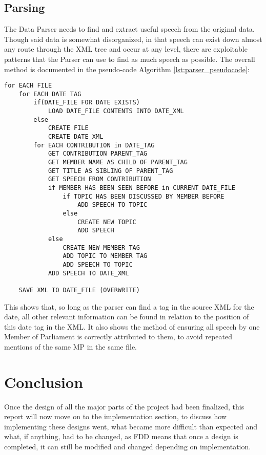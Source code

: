 \subsection{Parsing}
\label{sec:des_Parsing_algorithm}
The Data Parser needs to find and extract useful speech from the original data. Though said data is somewhat disorganized, in that speech can exist down almost any route through the XML tree and occur at any level, there are exploitable patterns that the Parser can use to find as much speech as possible. The overall method is documented in the pseudo-code Algorithm \ref{lst:parser_pseudocode}:
\begin{lstlisting}[float=ht, caption={Data Parser Pseudo-code}, label={lst:parser_pseudocode}]
for EACH FILE
    for EACH DATE TAG
    	if(DATE_FILE FOR DATE EXISTS)
        	LOAD DATE_FILE CONTENTS INTO DATE_XML
    	else
        	CREATE FILE
        	CREATE DATE_XML
    	for EACH CONTRIBUTION in DATE_TAG
        	GET CONTRIBUTION PARENT_TAG
        	GET MEMBER NAME AS CHILD OF PARENT_TAG
        	GET TITLE AS SIBLING OF PARENT_TAG
        	GET SPEECH FROM CONTRIBUTION
        	if MEMBER HAS BEEN SEEN BEFORE in CURRENT DATE_FILE
        	    if TOPIC HAS BEEN DISCUSSED BY MEMBER BEFORE
        			ADD SPEECH TO TOPIC
        		else
        			CREATE NEW TOPIC
        			ADD SPEECH
        	else
        		CREATE NEW MEMBER TAG
        		ADD TOPIC TO MEMBER TAG
        		ADD SPEECH TO TOPIC
        	ADD SPEECH TO DATE_XML

    SAVE XML TO DATE_FILE (OVERWRITE)
\end{lstlisting}

This shows that, so long as the parser can find a tag in the source XML for the date, all other relevant information can be found in relation to the position of this date tag in the XML. It also shows the method of ensuring all speech by one Member of Parliament is correctly attributed to them, to avoid repeated mentions of the same MP in the same file.

\section{Conclusion}
Once the design of all the major parts of the project had been finalized, this report will now move on to the implementation section, to discuss how implementing these designs went, what became more difficult than expected and what, if anything, had to be changed, as FDD means that once a design is completed, it can still be modified and changed depending on implementation.